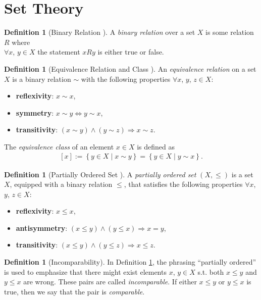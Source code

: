 \documentclass[12pt, a4paper]{article}
\numberwithin{equation}{section}
\theoremstyle{definition}
\theoremstyle{definition}
\newtheorem{defn}[thm]{Definition} %
\begin{document}
	\section{Set Theory}
	\begin{defn}[Binary Relation \cite{binary_relations}]
		A \textit{binary relation} over a set $X$ is some relation $R$ where \\ $\forall x$, $y\in X$ the statement $xRy$ is either true or false. 
	\end{defn}
	
	\begin{defn}[Equivalence Relation and Class \cite{equivalence_relation}]
		An \textit{equivalence relation} on a set $X$ is a binary relation $\sim$ with the following properties $\forall x$, $y$, $z \in X$: 
		\begin{itemize}
			\item \textbf{reflexivity}: $x\sim x$, 
			\item \textbf{symmetry}: $x \sim y\Leftrightarrow y\sim x$, 
			\item  \textbf{transitivity}: $\left(x\sim y\right) \wedge \left(y\sim z\right)\Rightarrow x\sim z$.  
		\end{itemize}
		The \textit{equivalence class} of an element $x\in X$ is defined as 
		\begin{align}
			\left[x\right] := \left\{y\in X \mid x\sim y \right\} = \left\{ y\in X \mid y\sim x \right\}. 
		\end{align}
	\end{defn}

	\begin{defn}[Partially Ordered Set \cite{kuratowski_zorn_lemma}]\label{partially_ordered_set}
		A \textit{partially ordered set}  $\left(X, \leq\right)$ is a set $X$, equipped with a binary relation $\leq$, that satisfies the following properties $\forall x$, $y$, $z\in X$:
		\begin{itemize}
			\item \textbf{reflexivity}: $x\leq x$, 
			\item \textbf{antisymmetry}: $\left(x\leq y\right) \wedge \left(y\leq x\right) \Rightarrow x = y$, 
			\item \textbf{transitivity}: $\left(x\leq y\right) \wedge \left(y\leq z\right)\Rightarrow x\leq z$. 
		\end{itemize}
	\end{defn}

	\begin{defn}[Incomparability]
		In Definition \ref{partially_ordered_set}, the phrasing \enquote{partially ordered} is used to emphasize that there might exist elements $x$, $y\in X$ s.t. both $x\leq y$ and $y\leq x$ are wrong. These pairs are called \textit{incomparable}. If either $x\leq y$ or $y \leq x$ is true, then we say that the pair is \textit{comparable}. 
	\end{defn}
	
\end{document}
